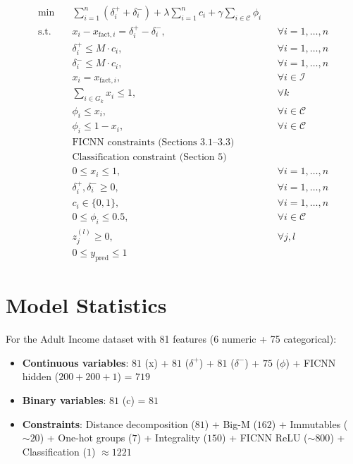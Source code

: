 \documentclass{article}
\begin{document}
\begin{align}
\min \quad & \sum_{i=1}^{n} (\delta_i^+ + \delta_i^-) + \lambda \sum_{i=1}^{n} c_i + \gamma \sum_{i \in \mathcal{C}} \phi_i \\
\text{s.t.} \quad & x_i - x_{\text{fact},i} = \delta_i^+ - \delta_i^-, && \forall i = 1, \ldots, n \\
& \delta_i^+ \leq M \cdot c_i, && \forall i = 1, \ldots, n \\
& \delta_i^- \leq M \cdot c_i, && \forall i = 1, \ldots, n \\
& x_i = x_{\text{fact},i}, && \forall i \in \mathcal{I} \\
& \sum_{i \in G_k} x_i \leq 1, && \forall k \\
& \phi_i \leq x_i, && \forall i \in \mathcal{C} \\
& \phi_i \leq 1 - x_i, && \forall i \in \mathcal{C} \\
& \text{FICNN constraints (Sections 3.1--3.3)} \\
& \text{Classification constraint (Section 5)} \\
& 0 \leq x_i \leq 1, && \forall i = 1, \ldots, n \\
& \delta_i^+, \delta_i^- \geq 0, && \forall i = 1, \ldots, n \\
& c_i \in \{0, 1\}, && \forall i = 1, \ldots, n \\
& 0 \leq \phi_i \leq 0.5, && \forall i \in \mathcal{C} \\
& z_j^{(l)} \geq 0, && \forall j, l \\
& 0 \leq y_{\text{pred}} \leq 1
\end{align}

\section{Model Statistics}

For the Adult Income dataset with 81 features (6 numeric + 75 categorical):
\begin{itemize}
    \item \textbf{Continuous variables}: $81$ (x) + $81$ ($\delta^+$) + $81$ ($\delta^-$) + $75$ ($\phi$) + FICNN hidden ($200 + 200 + 1$) = $719$
    \item \textbf{Binary variables}: $81$ (c) = $81$
    \item \textbf{Constraints}: Distance decomposition ($81$) + Big-M ($162$) + Immutables ($\sim 20$) + One-hot groups ($7$) + Integrality ($150$) + FICNN ReLU ($\sim 800$) + Classification ($1$) $\approx 1221$
\end{itemize}
\end{document}
